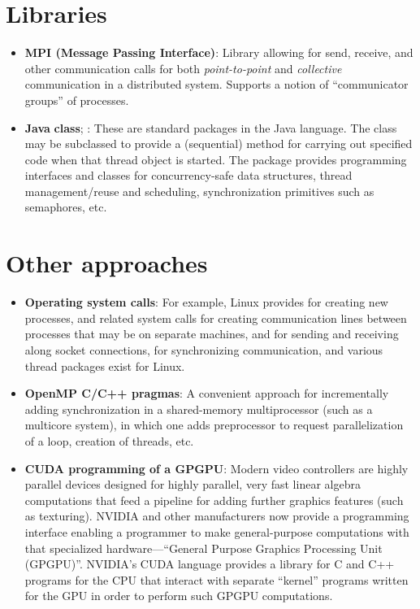 \documentclass[letterpaper,10pt,openany,oneside]{sphinxmanual}
\begin{document}
\section{Libraries}
\label{AccessingConcurrency/AccessingConcurrency:libraries}\begin{itemize}
\item {} 
\textbf{MPI (Message Passing Interface)}: Library allowing for send, receive, and other communication calls for both \emph{point-to-point} and \emph{collective} communication in a distributed system. Supports a notion of ``communicator groups'' of processes.

\item {} 
\textbf{Java}  \textbf{class}; : These are standard packages in the Java language. The  class may be subclassed to provide a (sequential)  method for carrying out specified code when that thread object is started. The package  provides programming interfaces and classes for concurrency-safe data structures, thread management/reuse and scheduling, synchronization primitives such as semaphores, etc.

\end{itemize}


\section{Other approaches}
\label{AccessingConcurrency/AccessingConcurrency:other-approaches}\begin{itemize}
\item {} 
\textbf{Operating system calls}: For example, Linux provides  for creating new processes,  and related system calls for creating communication lines between processes that may be on separate machines,  and  for sending and receiving along socket connections,  for synchronizing communication, and various thread packages exist for Linux.

\item {} 
\textbf{OpenMP C/C++ pragmas}: A convenient approach for incrementally adding synchronization in a shared-memory multiprocessor (such as a multicore system), in which one adds preprocessor  to request parallelization of a  loop, creation of threads, etc.

\item {} 
\textbf{CUDA programming of a GPGPU}: Modern video controllers are highly parallel devices designed for highly parallel, very fast linear algebra computations that feed a pipeline for adding further graphics features (such as texturing). NVIDIA and other manufacturers now provide a programming interface enabling a programmer to make general-purpose computations with that specialized hardware---``General Purpose Graphics Processing Unit (GPGPU)''. NVIDIA's CUDA language provides a library for C and C++ programs for the CPU that interact with separate ``kernel'' programs written for the GPU in order to perform such GPGPU computations.

\end{itemize}



\renewcommand{\indexname}{Index}
\printindex
\end{document}
